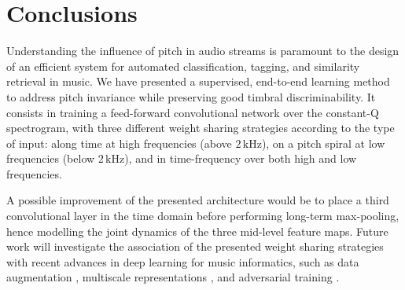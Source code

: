 \documentclass{article}
\begin{document}
\section{Conclusions}
Understanding the influence of pitch in audio streams is paramount to the design of
an efficient system for automated classification, tagging, and similarity retrieval in music. 
We have presented a supervised, end-to-end learning method to address pitch invariance
while preserving good timbral discriminability.
It consists in training a feed-forward convolutional network over the constant-Q spectrogram,
with three different weight sharing strategies according to the type of input:
along time at high frequencies (above $2\,\mathrm{kHz}$),
on a pitch spiral at low frequencies (below $2\,\mathrm{kHz}$),
and in time-frequency over both high and low frequencies.

A possible improvement of the presented architecture would be to
place a third convolutional layer in the time domain before performing long-term
max-pooling, hence modelling the joint dynamics of the three mid-level feature maps.
Future work will investigate the association of the presented weight sharing strategies
with recent advances in deep learning for music informatics,
such as data augmentation \cite{McFee2015-muda},
multiscale representations \cite{Hamel2012, Anden2015},
and adversarial training \cite{Kereliuk2015}.


\end{document}

